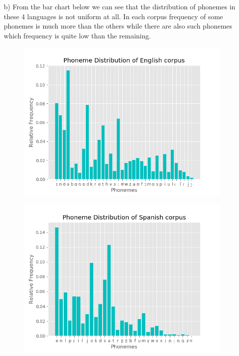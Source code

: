 \documentclass{article}
\begin{document}
\begin{itemize}
	\item[b)]
	    From the bar chart below we can see that the distribution of phonemes in these 4 languages is not uniform at all. In each corpus frequency of some phonemes is much more than the others while there are also such phonemes which frequency is quite low than the remaining.  
		\begin{figure}[H]
            \centering
                \begin{minipage}{.55\textwidth}
                    \centering
                    \includegraphics[keepaspectratio=true,scale=0.35]{./source/EX1.1_files/English.png} 
                    \label{fig:prob1_6_2}
                \end{minipage}%
                \begin{minipage}{.5\textwidth}
                    \centering
                    \includegraphics[keepaspectratio=true,scale=0.35]{./source/EX1.1_files/Spanish.png}   

\end{minipage}
\end{figure}
\end{itemize}
\end{document}
